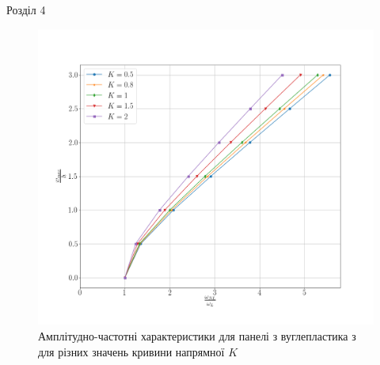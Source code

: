 \documentclass[8pt]{beamer}
\numberwithin{figure}{section}
\numberwithin{equation}{section}
\numberwithin{table}{section}
\begin{document}
\begin{frame}{Розділ 4}

\begin{figure}
	\includegraphics[scale=0.2]{pic/AFR_curvature.png}
		\caption{Амплітудно-частотні характеристики для панелі з вуглепластика з для різних значень кривини напрямної $K$}
		\label{fig:AFR_layers}
\end{figure}

\end{frame}
\end{document}
